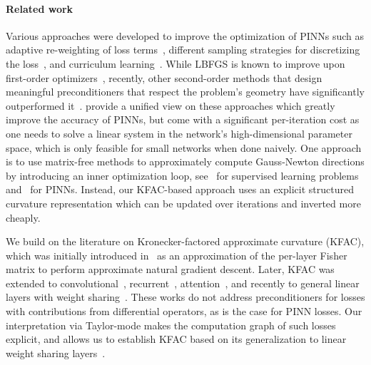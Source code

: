 \paragraph{Related work}
Various approaches were developed to improve the optimization of PINNs such as adaptive re-weighting of loss terms~\citep{wang2021understanding,van2022optimally,wang2022and}, different sampling strategies for discretizing the loss~\citep{lu2021deepxde, nabian2021efficient, daw2022rethinking,zapf2022investigating, wang2022respecting, wu2023comprehensive}, and curriculum learning~\citep{krishnapriyan2021characterizing, wang2022respecting}.
While LBFGS is known to improve upon first-order optimizers~\citep{markidis2021old},
recently, other second-order methods that design meaningful preconditioners that respect the problem's geometry have significantly outperformed it~\cite{zeng2022competitive, muller2023achieving, de2023operator, liu2024preconditioning, jnini2024gauss,chen2024teng, zampini2024petscml}.
\citet{muller2024optimization} provide a unified view on these approaches which greatly improve the accuracy of PINNs, but come with a significant per-iteration cost as one needs to solve a linear system in the network's high-dimensional parameter space, which is only feasible for small networks when done naively.
One approach is to use matrix-free methods to approximately compute Gauss-Newton directions by introducing an inner optimization loop, see~\cite{schraudolph2002fast,martens2010deep} for supervised learning problems and~\cite{zeng2022competitive,bonfanti2024challenges, jnini2024gauss,zampini2024petscml} for PINNs.
Instead, our KFAC-based approach uses an explicit structured curvature representation which can be updated over iterations and inverted more cheaply.

We build on the literature on Kronecker-factored approximate curvature (KFAC), which was initially introduced in~\citet{heskes2000natural,martens2010deep} as an approximation of the per-layer Fisher matrix to perform approximate natural gradient descent.
Later, KFAC was extended to convolutional~\citep{grosse2016kroneckerfactored}, recurrent~\citep{martens2018kroneckerfactored}, attention~\citep{pauloski2021kaisa,osawa2023pipefisher,grosse2023studying}, and recently to general linear layers with weight sharing~\cite{eschenhagen2023kroneckerfactored}.
These works do not address preconditioners for losses with contributions from differential operators, as is the case for PINN losses.
Our interpretation via Taylor-mode makes the computation graph of such losses explicit, and allows us to establish KFAC based on its generalization to linear weight sharing layers~\cite{eschenhagen2023kroneckerfactored}.

